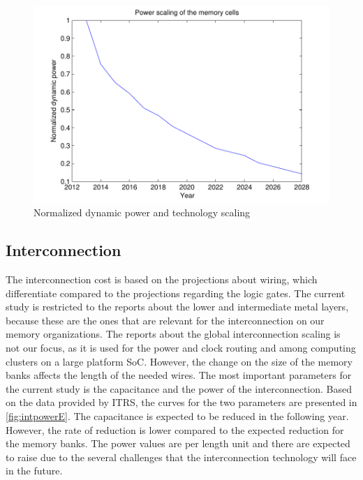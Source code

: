   \begin{figure}
 \centering
 \includegraphics[width = \textwidth]{E/cellpower.pdf}
  \caption{Normalized dynamic power and technology scaling}
 \label{fig:powerE}
 \end{figure}

\subsection{Interconnection}

The interconnection cost is based on the projections about wiring, which differentiate compared to the projections regarding the logic gates.
The current study is restricted to the reports about the lower and intermediate metal layers, because these are the ones that are relevant for the interconnection on our memory organizations.
The reports about the global interconnection scaling is not our focus, as it is used for the power and clock routing and among computing clusters on a large platform SoC.
However, the change on the size of the memory banks affects the length of the needed wires.
The most important parameters for the current study is the capacitance and the power of the interconnection.
Based on the data provided by ITRS, the curves for the two parameters are presented in \ref{fig:intpowerE}.
The capacitance is expected to be reduced in the following year.
However, the rate of reduction is lower compared to the expected reduction for the memory banks.
The power values are per length unit and there are expected to raise due to the several challenges that the interconnection technology will face in the future.

